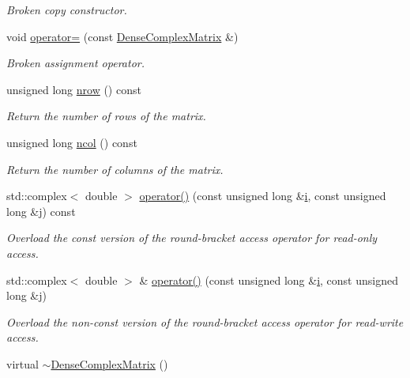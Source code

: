 \begin{DoxyCompactItemize}
\begin{DoxyCompactList}\small\item\em Broken copy constructor. \end{DoxyCompactList}\item 
void \hyperlink{classoomph_1_1DenseComplexMatrix_a6a4e396c02a3d0407ce7facbffac954b}{operator=} (const \hyperlink{classoomph_1_1DenseComplexMatrix}{Dense\+Complex\+Matrix} \&)
\begin{DoxyCompactList}\small\item\em Broken assignment operator. \end{DoxyCompactList}\item 
unsigned long \hyperlink{classoomph_1_1DenseComplexMatrix_aea9edba37ef5fd679d17f22eaeb85369}{nrow} () const
\begin{DoxyCompactList}\small\item\em Return the number of rows of the matrix. \end{DoxyCompactList}\item 
unsigned long \hyperlink{classoomph_1_1DenseComplexMatrix_a4101f581e470c940bf7daf12ec1b234f}{ncol} () const
\begin{DoxyCompactList}\small\item\em Return the number of columns of the matrix. \end{DoxyCompactList}\item 
std\+::complex$<$ double $>$ \hyperlink{classoomph_1_1DenseComplexMatrix_ad59f7b0bbbbce05868a80fcfd3f08560}{operator()} (const unsigned long \&\hyperlink{cfortran_8h_adb50e893b86b3e55e751a42eab3cba82}{i}, const unsigned long \&j) const
\begin{DoxyCompactList}\small\item\em Overload the const version of the round-\/bracket access operator for read-\/only access. \end{DoxyCompactList}\item 
std\+::complex$<$ double $>$ \& \hyperlink{classoomph_1_1DenseComplexMatrix_a01aecdcd48d058067ac9b550e8147fa6}{operator()} (const unsigned long \&\hyperlink{cfortran_8h_adb50e893b86b3e55e751a42eab3cba82}{i}, const unsigned long \&j)
\begin{DoxyCompactList}\small\item\em Overload the non-\/const version of the round-\/bracket access operator for read-\/write access. \end{DoxyCompactList}\item 
virtual \hyperlink{classoomph_1_1DenseComplexMatrix_a157f9dac417c294a9082efeffc123f2d}{$\sim$\+Dense\+Complex\+Matrix} ()

\end{DoxyCompactItemize}
